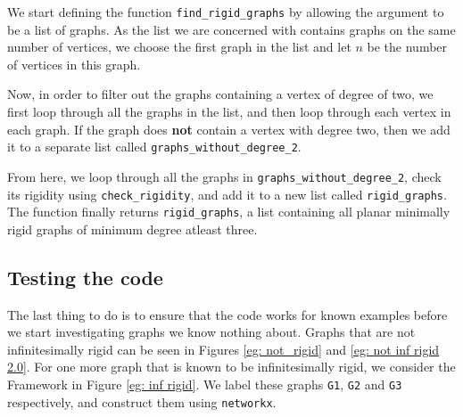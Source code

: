 \begin{flushleft}
We start defining the function \texttt{find\_rigid\_graphs} by allowing the argument to be a list of graphs. As the list we are concerned with contains graphs on the same number of vertices, we choose the first graph in the list and let $n$ be the number of vertices in this graph. 
\end{flushleft}

\begin{flushleft}
Now, in order to filter out the graphs containing a vertex of degree of two, we first loop through all the graphs in the list, and then loop through each vertex in each graph. If the graph does \textbf{not} contain a vertex with degree two, then we add it to a separate list called \texttt{graphs\_without\_degree\_2}. 
\end{flushleft}

\begin{flushleft}
From here, we loop through all the graphs in \texttt{graphs\_without\_degree\_2}, check its rigidity using \texttt{check\_rigidity}, and add it to a new list called \texttt{rigid\_graphs}. The function finally returns \texttt{rigid\_graphs}, a list containing all planar minimally rigid graphs of minimum degree atleast three.
\end{flushleft}

\subsection{Testing the code}

\begin{flushleft}
The last thing to do is to ensure that the code works for known examples before we start investigating graphs we know nothing about. Graphs that are not infinitesimally rigid can be seen in Figures \ref{eg: not_rigid} and \ref{eg: not inf rigid 2.0}. For one more graph that is known to be infinitesimally rigid, we consider the Framework in Figure \ref{eg: inf rigid}. We label these graphs \texttt{G1}, \texttt{G2} and \texttt{G3} respectively, and construct them using \texttt{networkx}.
\end{flushleft}

